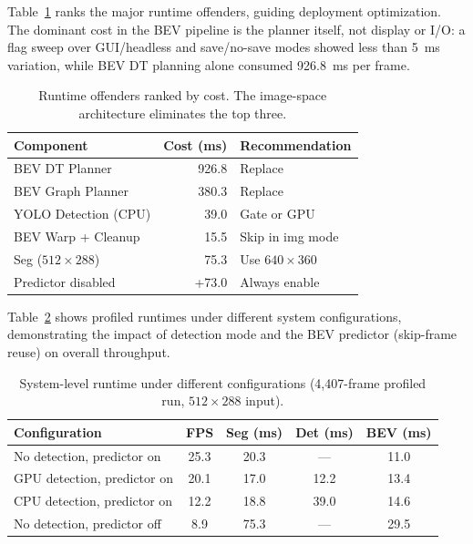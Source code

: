 \documentclass[a4paper,fleqn,10pt]{cas-dc}
\begin{document}
Table~\ref{tab:runtime_offenders} ranks the major runtime offenders, guiding deployment optimization. The dominant cost in the BEV pipeline is the planner itself, not display or I/O: a flag sweep over GUI/headless and save/no-save modes showed less than \SI{5}{ms} variation, while BEV DT planning alone consumed \SI{926.8}{ms} per frame.

\begin{table}[h]
\centering
\caption{Runtime offenders ranked by cost. The image-space architecture eliminates the top three.}
\label{tab:runtime_offenders}
\begin{tabular}{lrl}
\toprule
Component & Cost (ms) & Recommendation \\
\midrule
BEV DT Planner        & 926.8 & Replace \\
BEV Graph Planner      & 380.3 & Replace \\
YOLO Detection (CPU)   & 39.0  & Gate or GPU \\
BEV Warp + Cleanup     & 15.5  & Skip in img mode \\
Seg ($512{\times}288$) & 75.3  & Use $640{\times}360$ \\
Predictor disabled     & +73.0 & Always enable \\
\bottomrule
\end{tabular}
\end{table}


Table~\ref{tab:runtime_configs} shows profiled runtimes under different system configurations, demonstrating the impact of detection mode and the BEV predictor (skip-frame reuse) on overall throughput.

\begin{table}[h]
\centering
\caption{System-level runtime under different configurations (4,407-frame profiled run, $512{\times}288$ input).}
\label{tab:runtime_configs}
\begin{tabular}{lcccc}
\toprule
Configuration & FPS & Seg (ms) & Det (ms) & BEV (ms) \\
\midrule
No detection, predictor on    & 25.3 & 20.3 & --- & 11.0 \\
GPU detection, predictor on   & 20.1 & 17.0 & 12.2 & 13.4 \\
CPU detection, predictor on   & 12.2 & 18.8 & 39.0 & 14.6 \\
No detection, predictor off   & 8.9  & 75.3 & --- & 29.5 \\
\bottomrule
\end{tabular}
\end{table}
\end{document}
